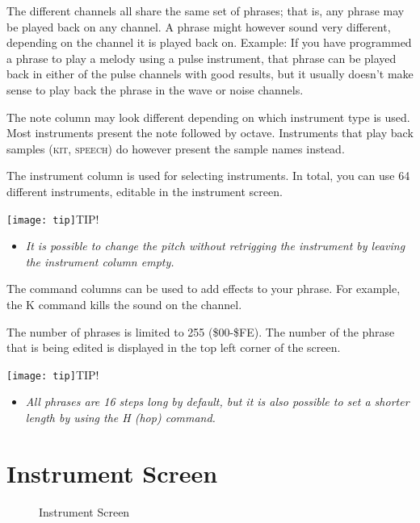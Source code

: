 The different channels all share the same set of phrases; that is, any phrase may be played back on any channel. A phrase might however sound very different, depending on the channel it is played back on. Example: If you have programmed a phrase to play a melody using a pulse instrument, that phrase can be played back in either of the pulse channels with good results, but it usually doesn't make sense to play back the phrase in the wave or noise channels.

The note column may look different depending on which instrument type is used. Most instruments present the note followed by octave. Instruments that play back samples (\textsc{kit}, \textsc{speech}) do however present the sample names instead.

The instrument column is used for selecting instruments. In total, you can use 64 different instruments, editable in the instrument screen.

\texttt{[image: tip]}TIP!
\begin{itemize}
\item \textit{It is possible to change the pitch without retrigging the instrument by leaving the instrument column empty.}
\end{itemize}

The command columns can be used to add effects to your phrase. For example, the K command kills the sound on the channel.

The number of phrases is limited to 255 (\$00-\$FE). The number of the phrase that is being edited is displayed in the top left corner of the screen.

\texttt{[image: tip]}TIP!
\begin{itemize}
\item \textit{All phrases are 16 steps long by default, but it is also possible to set a shorter length by using the H (hop) command.}
\end{itemize}


\section{Instrument Screen}

\begin{figure}[hbtp]
\centering
{}
\caption{Instrument Screen}
\label{fig:instr2}
\end{figure}

